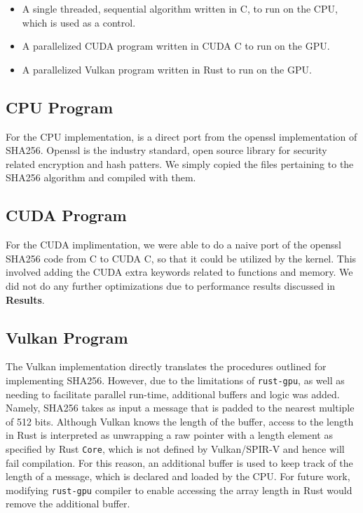\documentclass{article}
\begin{document}
\begin{itemize}
\item{} A single threaded, sequential algorithm written in C, to run on the CPU, which is used as a control.
\item{} A parallelized CUDA program written in CUDA C to run on the GPU.
\item{} A parallelized Vulkan program written in Rust to run on the GPU.
\end {itemize}

\subsection{CPU Program}

For the CPU implementation, is a direct port from the openssl implementation of SHA256. Openssl is the industry standard, open source library for security related encryption and hash patters. We simply copied the files pertaining to the SHA256 algorithm and compiled with them.

\subsection{CUDA Program}

For the CUDA implimentation, we were able to do a naive port of the openssl SHA256 code from C to CUDA C, so that it could be utilized by the kernel. This involved adding the CUDA extra keywords related to functions and memory. We did not do any further optimizations due to performance results discussed in \textbf{Results}.

\subsection{Vulkan Program}

The Vulkan implementation directly translates the procedures outlined for implementing SHA256. However, due to the limitations of \texttt{rust-gpu}, as well as needing to facilitate parallel run-time, additional buffers and logic was added. Namely, SHA256 takes as input a message that is padded to the nearest multiple of 512 bits. Although Vulkan knows the length of the buffer, access to the length in Rust is interpreted as unwrapping a raw pointer with a length element as specified by Rust \texttt{Core}, which is not defined by Vulkan/SPIR-V and hence will fail compilation. For this reason, an additional buffer is used to keep track of the length of a message, which is declared and loaded by the CPU. For future work, modifying \texttt{rust-gpu} compiler to enable accessing the array length in Rust would remove the additional buffer.
\end{document}
